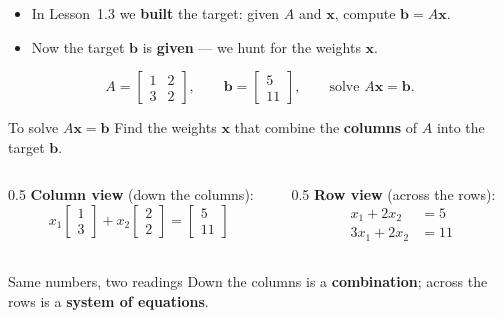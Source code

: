 \documentclass[aspectratio=169, 11pt]{beamer}
\newcommand{\xx}{\mathbf{x}}
\newcommand{\bb}{\mathbf{b}}
\begin{document}
\begin{frame}[t, plain]
  \begin{itemize}
    \setlength{\itemsep}{6pt}
    \item In Lesson~1.3 we \textbf{built} the target: given $A$ and $\xx$, compute $\bb=A\xx$.
    \item Now the target $\bb$ is \textbf{given} --- we hunt for the weights $\xx$.
  \end{itemize}
  \vspace{4pt}
  \[
    A = \begin{bmatrix} 1 & 2 \\ 3 & 2 \end{bmatrix}, \qquad
    \bb = \begin{bmatrix} 5 \\ 11 \end{bmatrix}, \qquad
    \text{solve } A\xx=\bb.
  \]
  \begin{block}{To solve $A\xx=\bb$}
    Find the weights $\xx$ that combine the \textbf{columns} of $A$ into the target $\bb$.
  \end{block}
\end{frame}

\begin{frame}[t, plain]
  \begin{columns}[T]
    \begin{column}{0.5\textwidth}
      \textbf{Column view} (down the columns):
      \[
        x_1\begin{bmatrix} 1 \\ 3 \end{bmatrix}
        + x_2\begin{bmatrix} 2 \\ 2 \end{bmatrix}
        = \begin{bmatrix} 5 \\ 11 \end{bmatrix}
      \]
    \end{column}
    \begin{column}{0.5\textwidth}
      \textbf{Row view} (across the rows):
      \[
        \begin{aligned}
          x_1 + 2x_2 &= 5 \\
          3x_1 + 2x_2 &= 11
        \end{aligned}
      \]
    \end{column}
  \end{columns}
  \vspace{8pt}
  \begin{block}{Same numbers, two readings}
    Down the columns is a \textbf{combination}; across the rows is a \textbf{system of equations}.
  \end{block}
\end{frame}
\end{document}
